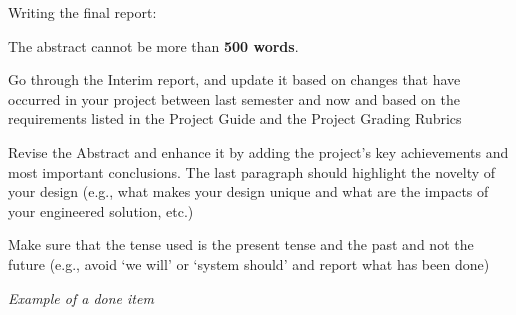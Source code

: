 \documentclass[../main.tex]{subfiles}
\begin{document}
\vfill
\begin{newrequirements}
    Writing the final report:
    \begin{todolist}
        \item[\done] The abstract cannot be more than \textbf{500 words}.
        \item[\done] Go through the Interim report, 
            and update it based on changes that have occurred 
            in your project between last semester and now
            and based on the requirements listed in the 
            Project Guide and the Project Grading Rubrics
        \item[\done] Revise the Abstract and enhance it by adding 
            the project’s key achievements and most important 
            conclusions. 
            The last paragraph should highlight the novelty 
            of your design (e.g., what makes your design 
            unique and what are the impacts of your 
            engineered solution, etc.)
        \item[\done] Make sure that the tense used is the present 
            tense and the past and not the future 
            (e.g., avoid ‘we will’ or ‘system should’ 
            and report what has been done) 
        \item[\done] \textit{Example of a done item}
    \end{todolist}
\end{newrequirements}
\vspace{0.5cm}
\end{document}
